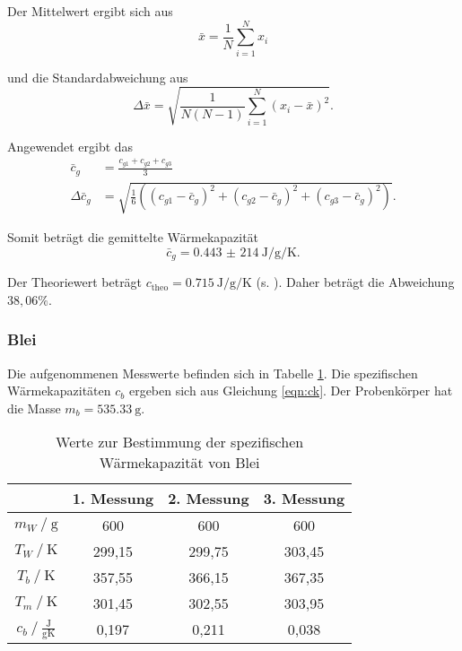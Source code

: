 Der Mittelwert ergibt sich aus
\begin{equation}
  \bar{x} = \frac{1}{N} \sum_{i=1}^{N} x_i
  \label{eqn:mit}
\end{equation}

und die Standardabweichung aus
\begin{equation}
  \Delta \bar{x} = \sqrt{\frac{1}{N (N - 1)} \sum_{i=1}^{N} (x_i - \bar{x})^2}.
  \label{eqn:sta}
\end{equation}

Angewendet ergibt das
\begin{align*}
  \bar{c}_g &= \frac{c_{g1}+c_{g2}+c_{g3}}{3} \\
  \Delta \bar{c}_g &= \sqrt{\frac{1}{6} \left((c_{g1}-\bar{c}_g)^2 + (c_{g2}-\bar{c}_g)^2 + (c_{g3}-\bar{c}_g)^2 \right)}.
\end{align*}

Somit beträgt die gemittelte Wärmekapazität
\begin{equation*}
  \bar{c}_g = \SI{0,443(214)}{\joule \per \gram \per \kelvin}.
\end{equation*}

Der Theoriewert beträgt $c_\text{theo} = \SI{0,715}{\joule \per \gram \per \kelvin}$ (s. \cite{sample2}).
Daher beträgt die Abweichung $38,06 \%$.

\subsubsection{Blei}
Die aufgenommenen Messwerte befinden sich in Tabelle \ref{tab:blei}.
Die spezifischen Wärmekapazitäten $c_b$ ergeben sich aus Gleichung \eqref{eqn:ck}.
Der Probenkörper hat die Masse $m_b = \SI{535,33}{\g}$.
\begin{table}[H]
  \centering
  \caption{Werte zur Bestimmung der spezifischen Wärmekapazität von Blei}
  \label{tab:blei}
  \begin{tabular}{c c c c}
    \toprule
       & {1. Messung} & {2. Messung} & {3. Messung}\\
    \midrule
      $m_W \:/\: \mathrm{g}$ & 600 & 600 & 600 \\
      $T_W \:/\: \mathrm{K}$ & 299,15 & 299,75 & 303,45 \\
      $T_b \:/\: \mathrm{K}$ & 357,55 & 366,15 & 367,35 \\
      $T_m \:/\: \mathrm{K}$ & 301,45 & 302,55 & 303,95 \\
      $c_b \:/\: \mathrm{\frac{J}{g K}}$ & 0,197 & 0,211 & 0,038 \\
    \bottomrule
  \end{tabular}
\end{table}


